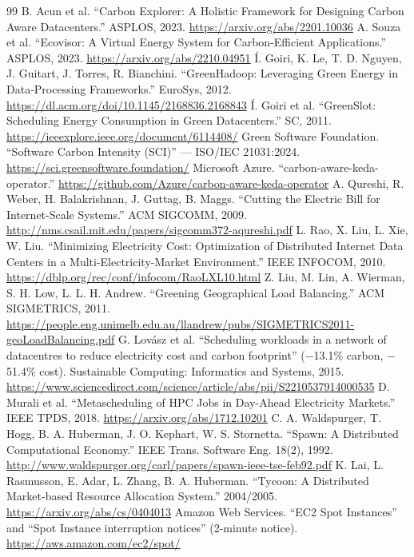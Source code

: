 \documentclass{article}
\begin{document}
\begin{thebibliography}{99}
 B. Acun et al. ``Carbon Explorer: A Holistic Framework for Designing Carbon Aware Datacenters.'' ASPLOS, 2023. \url{https://arxiv.org/abs/2201.10036}
 A. Souza et al. ``Ecovisor: A Virtual Energy System for Carbon-Efficient Applications.'' ASPLOS, 2023. \url{https://arxiv.org/abs/2210.04951}
 \'I. Goiri, K. Le, T. D. Nguyen, J. Guitart, J. Torres, R. Bianchini. ``GreenHadoop: Leveraging Green Energy in Data-Processing Frameworks.'' EuroSys, 2012. \url{https://dl.acm.org/doi/10.1145/2168836.2168843}
 \'I. Goiri et al. ``GreenSlot: Scheduling Energy Consumption in Green Datacenters.'' SC, 2011. \url{https://ieeexplore.ieee.org/document/6114408/}
 Green Software Foundation. ``Software Carbon Intensity (SCI)'' --- ISO/IEC 21031:2024. \url{https://sci.greensoftware.foundation/}
 Microsoft Azure. ``carbon-aware-keda-operator.'' \url{https://github.com/Azure/carbon-aware-keda-operator}
 A. Qureshi, R. Weber, H. Balakrishnan, J. Guttag, B. Maggs. ``Cutting the Electric Bill for Internet-Scale Systems.'' ACM SIGCOMM, 2009. \url{http://nms.csail.mit.edu/papers/sigcomm372-aqureshi.pdf}
 L. Rao, X. Liu, L. Xie, W. Liu. ``Minimizing Electricity Cost: Optimization of Distributed Internet Data Centers in a Multi-Electricity-Market Environment.'' IEEE INFOCOM, 2010. \url{https://dblp.org/rec/conf/infocom/RaoLXL10.html}
 Z. Liu, M. Lin, A. Wierman, S. H. Low, L. L. H. Andrew. ``Greening Geographical Load Balancing.'' ACM SIGMETRICS, 2011. \url{https://people.eng.unimelb.edu.au/llandrew/pubs/SIGMETRICS2011-geoLoadBalancing.pdf}
 G. Lov\'asz et al. ``Scheduling workloads in a network of datacentres to reduce electricity cost and carbon footprint'' ($-$13.1\% carbon, $-$51.4\% cost). Sustainable Computing: Informatics and Systems, 2015. \url{https://www.sciencedirect.com/science/article/abs/pii/S2210537914000535}
 D. Murali et al. ``Metascheduling of HPC Jobs in Day-Ahead Electricity Markets.'' IEEE TPDS, 2018. \url{https://arxiv.org/abs/1712.10201}
 C. A. Waldspurger, T. Hogg, B. A. Huberman, J. O. Kephart, W. S. Stornetta. ``Spawn: A Distributed Computational Economy.'' IEEE Trans. Software Eng. 18(2), 1992. \url{http://www.waldspurger.org/carl/papers/spawn-ieee-tse-feb92.pdf}
 K. Lai, L. Rasmusson, E. Adar, L. Zhang, B. A. Huberman. ``Tycoon: A Distributed Market-based Resource Allocation System.'' 2004/2005. \url{https://arxiv.org/abs/cs/0404013}
 Amazon Web Services. ``EC2 Spot Instances'' and ``Spot Instance interruption notices'' (2-minute notice). \url{https://aws.amazon.com/ec2/spot/}

\end{thebibliography}
\end{document}
